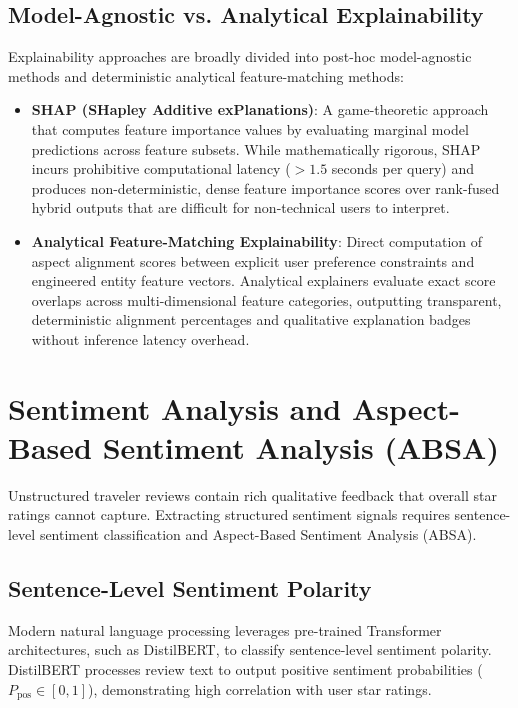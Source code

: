 \subsection{Model-Agnostic vs. Analytical Explainability}
Explainability approaches are broadly divided into post-hoc model-agnostic methods and deterministic analytical feature-matching methods:
\begin{itemize}
    \item \textbf{SHAP (SHapley Additive exPlanations)}: A game-theoretic approach that computes feature importance values by evaluating marginal model predictions across feature subsets. While mathematically rigorous, SHAP incurs prohibitive computational latency ($>1.5$ seconds per query) and produces non-deterministic, dense feature importance scores over rank-fused hybrid outputs that are difficult for non-technical users to interpret.
    \item \textbf{Analytical Feature-Matching Explainability}: Direct computation of aspect alignment scores between explicit user preference constraints and engineered entity feature vectors. Analytical explainers evaluate exact score overlaps across multi-dimensional feature categories, outputting transparent, deterministic alignment percentages and qualitative explanation badges without inference latency overhead.
\end{itemize}

\section{Sentiment Analysis and Aspect-Based Sentiment Analysis (ABSA)}
Unstructured traveler reviews contain rich qualitative feedback that overall star ratings cannot capture. Extracting structured sentiment signals requires sentence-level sentiment classification and Aspect-Based Sentiment Analysis (ABSA).

\subsection{Sentence-Level Sentiment Polarity}
Modern natural language processing leverages pre-trained Transformer architectures, such as DistilBERT, to classify sentence-level sentiment polarity. DistilBERT processes review text to output positive sentiment probabilities ($P_{\text{pos}} \in [0, 1]$), demonstrating high correlation with user star ratings.


